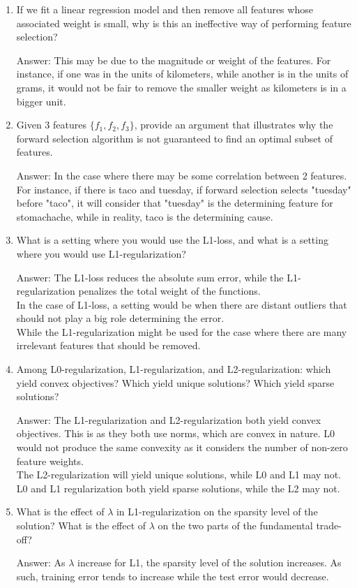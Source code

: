 \documentclass{article}
\def\ans#1{\par\gre{Answer: #1}}
\def\gre#1{{\color{gre}#1}}
\def\enum#1{\begin{enumerate}#1\end{enumerate}}
\begin{document}
\enum{
\item If we fit a linear regression model and then remove all features whose associated weight is small, why is this an ineffective way of performing feature selection?
\ans{This may be due to the magnitude or weight of the features. For instance, if one was in the units of kilometers, while another is in the units of grams, it would not be fair to remove the smaller weight as kilometers is in a bigger unit.}
\item Given $3$ features $\{f_1, f_2, f_3\}$, provide an argument that illustrates why the forward selection algorithm is not guaranteed to find an optimal subset of features.
\ans{In the case where there may be some correlation between 2 features. For instance, if there is taco and tuesday, if forward selection selects "tuesday" before "taco", it will consider that "tuesday" is the determining feature for stomachache, while in reality, taco is the determining cause.}
\item What is a setting where you would use the L1-loss, and what is a setting where you would use L1-regularization?
\ans{The L1-loss reduces the absolute sum error, while the L1-regularization penalizes the total weight of the functions. \\
In the case of L1-loss, a setting would be when there are distant outliers that should not play a big role determining the error. \\
While the L1-regularization might be used for the case where there are many irrelevant features that should be removed.}
\item Among L0-regularization, L1-regularization, and L2-regularization: which yield convex objectives? Which yield unique solutions? Which yield sparse solutions?
\ans{The L1-regularization and L2-regularization both yield convex objectives. This is as they both use norms, which are convex in nature. L0 would not produce the same convexity as it considers the number of non-zero feature weights. \\
The L2-regularization will yield unique solutions, while L0 and L1 may not. \\
L0 and L1 regularization both yield sparse solutions, while the L2 may not.
}
\item What is the effect of $\lambda$ in L1-regularization on the sparsity level of the solution? What is the effect of $\lambda$ on the two parts of the fundamental trade-off?
\ans{As $\lambda$ increase for L1, the sparsity level of the solution increases. As such, training error tends to increase while the test error would decrease.}
}
\end{document}
